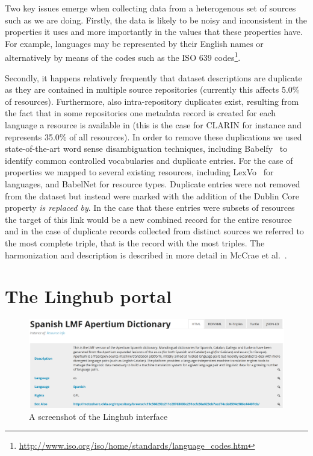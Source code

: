 \documentclass{acm_proc_article-sp}
\begin{document}
Two key issues emerge when collecting data from a heterogenous set of sources 
such as we are doing. Firstly, the data is likely to be noisy and inconsistent 
in the properties it uses and more importantly in the values that these
properties have. For example, languages may be represented by their English 
names or alternatively by means of the codes such as the ISO 639
codes\footnote{\url{http://www.iso.org/iso/home/standards/language_codes.htm}}. 

Secondly, it happens relatively frequently that dataset descriptions are
duplicate as they are contained in multiple source repositories (currently this
affects 5.0\% of resources).
Furthermore, also intra-repository duplicates exist, resulting from the fact
that in some repositories one metadata record is created for each language a
resource is available in (this is the case for CLARIN for instance and
represents 35.0\% of all resources). In order to remove
these duplications we used state-of-the-art word sense disambiguation techniques, 
including Babelfy~\cite{Moroetal:14tacl} to identify common controlled vocabularies and duplicate
entries. For the case of properties we mapped to several existing resources, 
including LexVo~\cite{de2013lexvo} for languages, and BabelNet for resource types. Duplicate 
entries were not removed from the dataset but instead were marked with the addition
of the Dublin Core property \emph{is replaced by}. In the case that these entries
were subsets of resources the target of this link would be a new combined record
for the entire resource and in the case of duplicate records collected from distinct
sources we referred to the most complete triple, that is the record with the most
triples. The harmonization and description is described in more detail in McCrae
et al.~\cite{mccrae2015reconciling}.

\section{The Linghub portal}

\label{sec:portal}

\begin{figure}
\includegraphics[width=\textwidth]{linghub-screenshot.png}
\caption{A screenshot of the Linghub interface\label{fig:screenshot}}
\end{figure}
\end{document}
